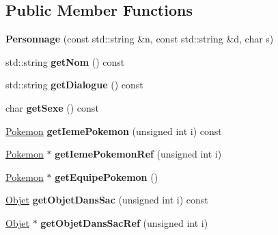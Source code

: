 \subsection*{Public Member Functions}
\begin{DoxyCompactItemize}
\item 
\mbox{\label{class_personnage_a8ed6fad2f650ba45a3cf3586cbd1d1b7}} 
{\bfseries Personnage} (const std\+::string \&n, const std\+::string \&d, char s)
\item 
\mbox{\label{class_personnage_a411597dd00afced2f6eeb70461833dbe}} 
std\+::string {\bfseries get\+Nom} () const
\item 
\mbox{\label{class_personnage_a3ca6a49bfbf0edc453dd1ae82d95ae71}} 
std\+::string {\bfseries get\+Dialogue} () const
\item 
\mbox{\label{class_personnage_a07a28601294de4135b3d8721bc560ed8}} 
char {\bfseries get\+Sexe} () const
\item 
\mbox{\label{class_personnage_abd45dd4e1a4099a6300c037fc41e1037}} 
\hyperlink{class_pokemon}{Pokemon} {\bfseries get\+Ieme\+Pokemon} (unsigned int i) const
\item 
\mbox{\label{class_personnage_aeab0448ba1e833d57ee17827e3a6ac0d}} 
\hyperlink{class_pokemon}{Pokemon} $\ast$ {\bfseries get\+Ieme\+Pokemon\+Ref} (unsigned int i)
\item 
\mbox{\label{class_personnage_a853a057817adeacdf048534cf30254d2}} 
\hyperlink{class_pokemon}{Pokemon} $\ast$ {\bfseries get\+Equipe\+Pokemon} ()
\item 
\mbox{\label{class_personnage_a32cf123b507c36c8adbf9bd22cb0b9a2}} 
\hyperlink{class_objet}{Objet} {\bfseries get\+Objet\+Dans\+Sac} (unsigned int i) const
\item 
\mbox{\label{class_personnage_a6b3462a550a38c9e9163495c2b2015f4}} 
\hyperlink{class_objet}{Objet} $\ast$ {\bfseries get\+Objet\+Dans\+Sac\+Ref} (unsigned int i)
\item 
\mbox{\label{class_personnage_aa6dd3ce808644f01d0cdb891f67e896c}} 

\end{DoxyCompactItemize}
